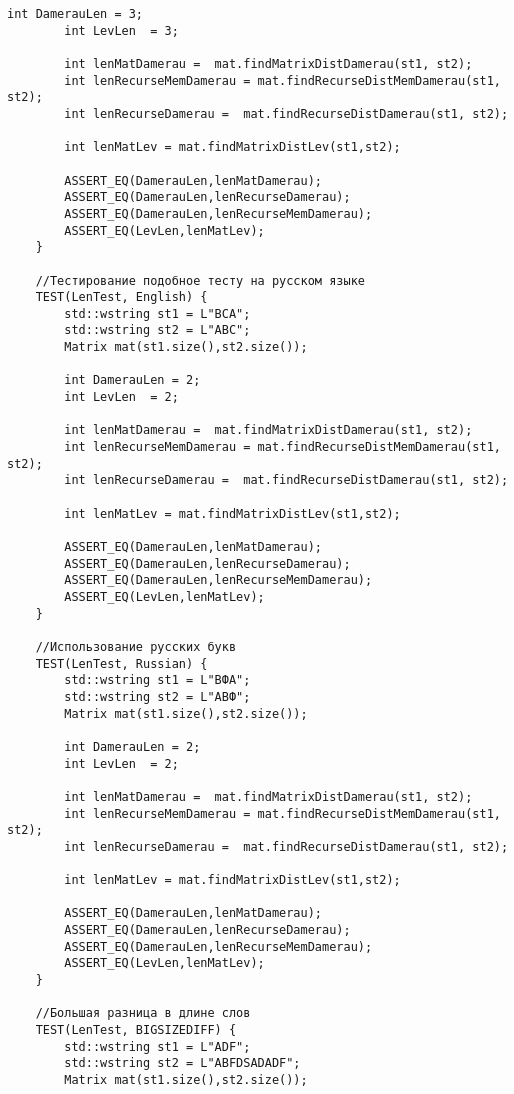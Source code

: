 \begin{lstlisting}[label=lst:unit_tests, caption=Модульные тесты]
        int DamerauLen = 3;
        int LevLen  = 3;
        
        int lenMatDamerau =  mat.findMatrixDistDamerau(st1, st2);
        int lenRecurseMemDamerau = mat.findRecurseDistMemDamerau(st1, st2);
        int lenRecurseDamerau =  mat.findRecurseDistDamerau(st1, st2);
        
        int lenMatLev = mat.findMatrixDistLev(st1,st2);
        
        ASSERT_EQ(DamerauLen,lenMatDamerau);
        ASSERT_EQ(DamerauLen,lenRecurseDamerau);
        ASSERT_EQ(DamerauLen,lenRecurseMemDamerau);
        ASSERT_EQ(LevLen,lenMatLev);
    }
    
    //Тестирование подобное тесту на русском языке
    TEST(LenTest, English) {
        std::wstring st1 = L"BCA";
        std::wstring st2 = L"ABC";
        Matrix mat(st1.size(),st2.size());
        
        int DamerauLen = 2;
        int LevLen  = 2;
        
        int lenMatDamerau =  mat.findMatrixDistDamerau(st1, st2);
        int lenRecurseMemDamerau = mat.findRecurseDistMemDamerau(st1, st2);
        int lenRecurseDamerau =  mat.findRecurseDistDamerau(st1, st2);
        
        int lenMatLev = mat.findMatrixDistLev(st1,st2);
        
        ASSERT_EQ(DamerauLen,lenMatDamerau);
        ASSERT_EQ(DamerauLen,lenRecurseDamerau);
        ASSERT_EQ(DamerauLen,lenRecurseMemDamerau);
        ASSERT_EQ(LevLen,lenMatLev);
    }
    
    //Использование русских букв
    TEST(LenTest, Russian) {
        std::wstring st1 = L"ВФА";
        std::wstring st2 = L"АВФ";
        Matrix mat(st1.size(),st2.size());
        
        int DamerauLen = 2;
        int LevLen  = 2;
        
        int lenMatDamerau =  mat.findMatrixDistDamerau(st1, st2);
        int lenRecurseMemDamerau = mat.findRecurseDistMemDamerau(st1, st2);
        int lenRecurseDamerau =  mat.findRecurseDistDamerau(st1, st2);
        
        int lenMatLev = mat.findMatrixDistLev(st1,st2);
        
        ASSERT_EQ(DamerauLen,lenMatDamerau);
        ASSERT_EQ(DamerauLen,lenRecurseDamerau);
        ASSERT_EQ(DamerauLen,lenRecurseMemDamerau);
        ASSERT_EQ(LevLen,lenMatLev);
    }
    
    //Большая разница в длине слов
    TEST(LenTest, BIGSIZEDIFF) {
        std::wstring st1 = L"ADF";
        std::wstring st2 = L"ABFDSADADF";
        Matrix mat(st1.size(),st2.size());
        

\end{lstlisting}
